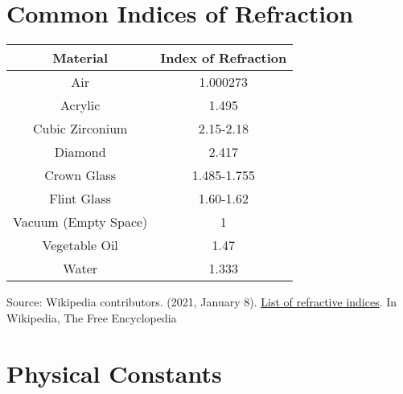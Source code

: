 \section{Common Indices of Refraction}
\begin{center}



	\begin{table}[h]
	\caption{\label{tab:refraction}Table of Common Indices of Refraction}
	
	\begin{longtable}{|c |c|}
		\hline
		\textbf{Material} & \textbf{Index of Refraction} \\
		\hline
		Air & 1.000273 \\
		\hline
		Acrylic & 1.495 \\
		\hline
		Cubic Zirconium & 2.15-2.18\\
		\hline
		Diamond & 2.417 \\
		\hline
		Crown Glass & 1.485-1.755\\
		\hline
		Flint Glass & 1.60-1.62 \\
		\hline
		Vacuum (Empty Space) & 1 \\
		\hline
		Vegetable Oil &1.47 \\
		\hline
		Water & 1.333 \\		
		\hline

	\end{longtable}


\end{table}
\end{center}
Source: Wikipedia contributors. (2021, January 8). \href{https://en.wikipedia.org/wiki/List_of_refractive_indices}{List of refractive indices}. In Wikipedia, The Free Encyclopedia


\newpage






\section{Physical Constants}
